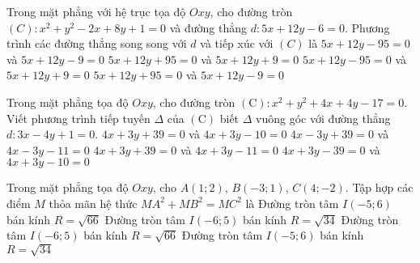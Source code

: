 \begin{ex}%
	Trong mặt phẳng với hệ trục tọa độ $Oxy$, cho đường tròn $(C)\colon x^2+y^2-2x+8y+1=0$ và đường thẳng $d\colon 5x+12y-6=0$. Phương trình các đường thẳng song song với $d$ và tiếp xúc với $(C)$ là
	\choice
	{$5x+12y-95=0$ và $5x+12y-9=0$}
	{$5x+12y+95=0$ và $5x+12y+9=0$}
	{$5x+12y-95=0$ và $5x+12y+9=0$}
	{\True $5x+12y+95=0$ và $5x+12y-9=0$}
\end{ex}

\begin{ex}%
	Trong mặt phẳng tọa độ $Oxy$, cho đường tròn $(\mathrm{C}): x^2+y^2+4x+4y-17=0$. Viết phương trình tiếp tuyến $\Delta$ của  $(\mathrm{C})$ biết $\Delta$ vuông góc với đường thẳng $d\colon 3x-4y+1=0$.
	\choice
	{$4x+3y+39=0$ và $4x+3y-10=0$}
	{$4x-3y+39=0$ và $4x-3y-11=0$}
	{\True $4x+3y+39=0$ và $4x+3y-11=0$}
	{$4x+3y-39=0$ và $4x+3y-10=0$}
\end{ex}

\begin{ex}%
	Trong mặt phẳng tọa độ $Oxy$, cho $A(1;2)$, $B(-3;1)$, $C(4;-2)$. Tập hợp các điểm $M$ thỏa mãn hệ thức $MA^2+MB^2=MC^2$ là
	\choice
	{Đường tròn tâm $I(-5;6)$ bán kính $R=\sqrt{66}$}
	{Đường tròn tâm $I(-6;5)$ bán kính $R=\sqrt{34}$}
	{\True Đường tròn tâm $I(-6;5)$ bán kính $R=\sqrt{66}$}
	{Đường tròn tâm $I(-5;6)$ bán kính $R=\sqrt{34}$}
\end{ex}

